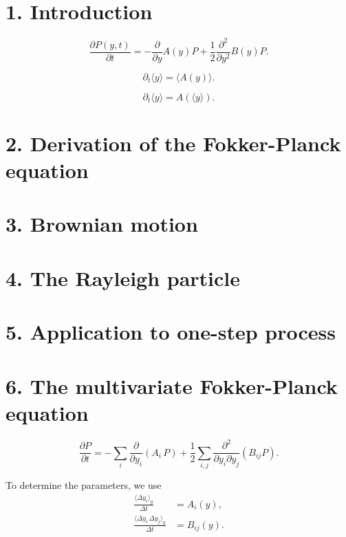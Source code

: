 \documentclass{book}
\begin{document}
\section{1. Introduction}

\begin{equation}
  \frac{ \partial P(y, t) }  { \partial t }
=
-\frac{\partial } {\partial y} A(y) P
+\frac{1}{2} \frac{ \partial^2 } { \partial y^2 } B(y) P.
\tag{1.1}
\end{equation}


\begin{equation}
\partial_t \langle y \rangle
= \langle A(y) \rangle.
\tag{1.7}
\end{equation}

$$
\partial_t \langle y \rangle
= A(\langle y \rangle).
$$

\section{2. Derivation of the Fokker-Planck equation}

\section{3. Brownian motion}

\section{4. The Rayleigh particle}

\section{5. Application to one-step process}

\section{6. The multivariate Fokker-Planck equation}

\begin{equation}
\frac{ \partial P } { \partial t }
=
-\sum_i \frac{ \partial } { \partial y_i } (A_i \, P)
+ \frac 1 2
\sum_{i, j} \frac{ \partial^2 } { \partial y_i \partial y_j } (B_{ij} P ).
\tag{6.1}
\end{equation}

To determine the parameters, we use
\begin{equation}
\begin{aligned}
\frac{ \langle \Delta y_i \rangle_y } { \Delta t }
&=
A_i(y), \\
\frac{ \langle \Delta y_i \, \Delta y_j \rangle_y } { \Delta t }
&=
B_{ij}(y).
\end{aligned}
\tag{6.3}
\end{equation}
\end{document}
